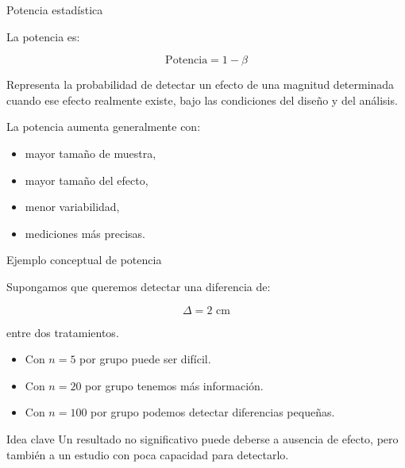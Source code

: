 \documentclass[aspectratio=169,11pt]{beamer}
\begin{document}
\begin{frame}{Potencia estadística}

La potencia es:

\[
\boxed{\text{Potencia}=1-\beta}
\]

Representa la probabilidad de detectar un efecto de una magnitud
determinada cuando ese efecto realmente existe, bajo las condiciones
del diseño y del análisis.

La potencia aumenta generalmente con:

\begin{itemize}
    \item mayor tamaño de muestra,
    \item mayor tamaño del efecto,
    \item menor variabilidad,
    \item mediciones más precisas.
\end{itemize}

\end{frame}

\begin{frame}{Ejemplo conceptual de potencia}

Supongamos que queremos detectar una diferencia de:

\[
\Delta=2\text{ cm}
\]

entre dos tratamientos.

\begin{itemize}
    \item Con $n=5$ por grupo puede ser difícil.
    \item Con $n=20$ por grupo tenemos más información.
    \item Con $n=100$ por grupo podemos detectar diferencias pequeñas.
\end{itemize}

\begin{alertblock}{Idea clave}
Un resultado no significativo puede deberse a ausencia de efecto,
pero también a un estudio con poca capacidad para detectarlo.
\end{alertblock}

\end{frame}
\end{document}
